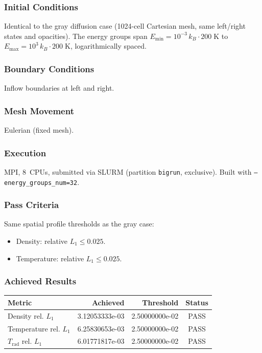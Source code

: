 \documentclass[11pt,a4paper]{article}
\begin{document}
\subsubsection*{Initial Conditions}
Identical to the gray diffusion case (1024-cell Cartesian mesh, same left/right states and opacities). The energy groups span $E_{\min} = 10^{-3}\,k_B\!\cdot\!200\;\mathrm{K}$ to $E_{\max} = 10^{3}\,k_B\!\cdot\!200\;\mathrm{K}$, logarithmically spaced.

\subsubsection*{Boundary Conditions}
Inflow boundaries at left and right.

\subsubsection*{Mesh Movement}
Eulerian (fixed mesh).

\subsubsection*{Execution}
MPI, 8~CPUs, submitted via SLURM (partition \texttt{bigrun}, exclusive). Built with \texttt{--energy\_groups\_num=32}.

\subsubsection*{Pass Criteria}
Same spatial profile thresholds as the gray case:
\begin{itemize}
  \item Density: relative $L_1 \le 0.025$.
  \item Temperature: relative $L_1 \le 0.025$.
\end{itemize}

\subsubsection*{Achieved Results}
\begin{table}[htbp]
\centering
\begin{tabular}{l r r c}
\toprule
\textbf{Metric} & \textbf{Achieved} & \textbf{Threshold} & \textbf{Status} \\
\midrule
Density rel. $L_1$ & 3.12053333e-03 & 2.50000000e-02 & {\color{green!60!black}PASS} \\
Temperature rel. $L_1$ & 6.25830653e-03 & 2.50000000e-02 & {\color{green!60!black}PASS} \\
$T_{\mathrm{rad}}$ rel. $L_1$ & 6.01771817e-03 & 2.50000000e-02 & {\color{green!60!black}PASS} \\
\bottomrule
\end{tabular}
\end{table}
\end{document}
